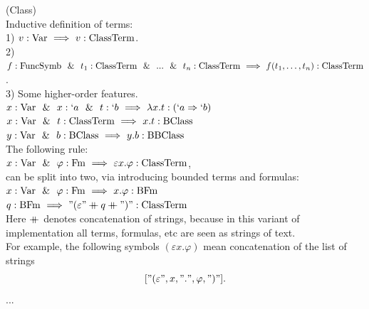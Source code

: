 \begin{definition}(Class)\\
Inductive definition of terms:\\
1) $v:\mathrm{Var} \ \Longrightarrow\  v:{\text{ClassTerm}}$.\\
2) 
$f:\mathrm{FuncSymb}\ \ \&\ \  t_1:{\text{ClassTerm}} \ \ \&\ \  ...\ \ \&\ \  t_n:{\text{ClassTerm}}  \ \Longrightarrow\  f(t_1,\dots,t_n):{\text{ClassTerm}}$.\\
3) Some higher-order features.\\
$x:\mathrm{Var} \ \ \&\ \  x:`a \ \ \&\ \  t:`b \ \Longrightarrow\  \lambda x.t: (`a \Rightarrow `b)$\\

$x:\mathrm{Var} \ \ \&\ \  t:{\text{ClassTerm}} \ \Longrightarrow\  x.t:\mathrm{BClass}$\\
$y:\mathrm{Var} \ \ \&\ \  b:\mathrm{BClass} \ \Longrightarrow\  y.b:\text{BBClass}$\\

The following rule:\\
$x:\mathrm{Var} \ \ \&\ \  \varphi:\mathrm{Fm} \ \Longrightarrow\  \varepsilon x.\varphi : {\text{ClassTerm}}$,\\
can be split into two, via introducing bounded terms and formulas:\\
$x:\mathrm{Var} \ \ \&\ \  \varphi: \mathrm{Fm} \ \Longrightarrow\  x.\varphi: \mathrm{BFm}$\\
$q:\mathrm{BFm} \ \Longrightarrow\  "(\varepsilon "\mathbin{+\mkern-10mu+} q \mathbin{+\mkern-10mu+}")": {\text{ClassTerm}}$\\
Here $\mathbin{+\mkern-10mu+}$ denotes concatenation of strings, because in this variant of implementation all terms, formulas, etc are seen as strings of text.\\
For example, the following symbols $(\varepsilon x . \varphi)$ mean concatenation of the list of strings \[["(\varepsilon ", x ," . ",  \varphi, ")"].\]
...
\end{definition}

